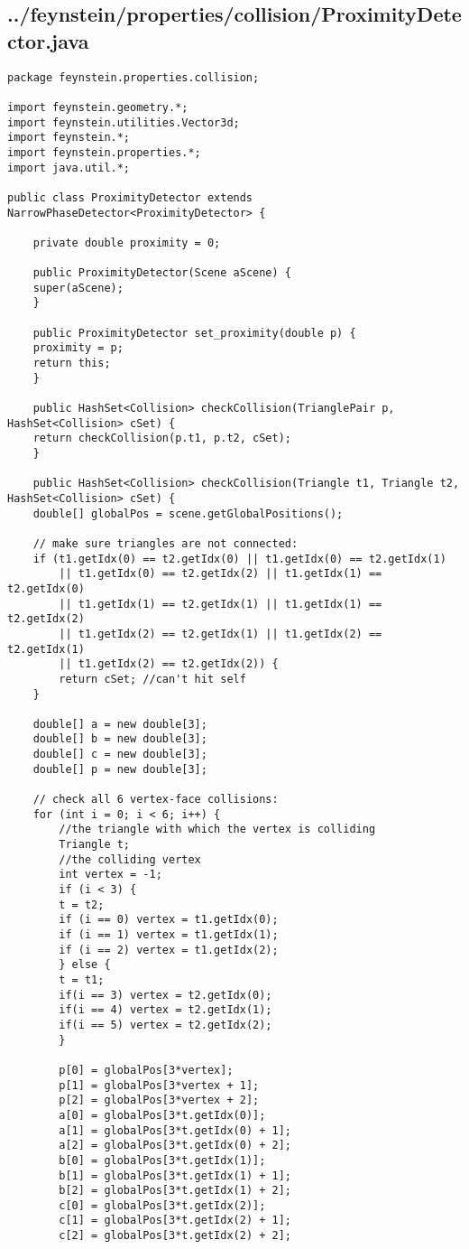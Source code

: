 \subsection*{../feynstein/properties/collision/ProximityDetector.java}
\begin{lstlisting}
package feynstein.properties.collision;

import feynstein.geometry.*;
import feynstein.utilities.Vector3d;
import feynstein.*;
import feynstein.properties.*;
import java.util.*;

public class ProximityDetector extends NarrowPhaseDetector<ProximityDetector> {

    private double proximity = 0;   

    public ProximityDetector(Scene aScene) {
	super(aScene);
    }

    public ProximityDetector set_proximity(double p) {
	proximity = p;
	return this;
    }
    
    public HashSet<Collision> checkCollision(TrianglePair p, HashSet<Collision> cSet) {
	return checkCollision(p.t1, p.t2, cSet);
    }

    public HashSet<Collision> checkCollision(Triangle t1, Triangle t2, HashSet<Collision> cSet) {
	double[] globalPos = scene.getGlobalPositions();

	// make sure triangles are not connected:
	if (t1.getIdx(0) == t2.getIdx(0) || t1.getIdx(0) == t2.getIdx(1) 
	    || t1.getIdx(0) == t2.getIdx(2) || t1.getIdx(1) == t2.getIdx(0) 
	    || t1.getIdx(1) == t2.getIdx(1) || t1.getIdx(1) == t2.getIdx(2) 
	    || t1.getIdx(2) == t2.getIdx(1) || t1.getIdx(2) == t2.getIdx(1) 
	    || t1.getIdx(2) == t2.getIdx(2)) {
	    return cSet; //can't hit self
	}
	
	double[] a = new double[3];
	double[] b = new double[3];
	double[] c = new double[3];
	double[] p = new double[3];

	// check all 6 vertex-face collisions:
	for (int i = 0; i < 6; i++) {
	    //the triangle with which the vertex is colliding
	    Triangle t;
	    //the colliding vertex
	    int vertex = -1;
	    if (i < 3) {
		t = t2;
		if (i == 0) vertex = t1.getIdx(0);
		if (i == 1) vertex = t1.getIdx(1);
		if (i == 2) vertex = t1.getIdx(2);
	    } else {
		t = t1;
		if(i == 3) vertex = t2.getIdx(0);
		if(i == 4) vertex = t2.getIdx(1);
		if(i == 5) vertex = t2.getIdx(2);
	    }

	    p[0] = globalPos[3*vertex];
	    p[1] = globalPos[3*vertex + 1];
	    p[2] = globalPos[3*vertex + 2];
	    a[0] = globalPos[3*t.getIdx(0)];	
	    a[1] = globalPos[3*t.getIdx(0) + 1];
	    a[2] = globalPos[3*t.getIdx(0) + 2];
	    b[0] = globalPos[3*t.getIdx(1)];
	    b[1] = globalPos[3*t.getIdx(1) + 1];
	    b[2] = globalPos[3*t.getIdx(1) + 2];
	    c[0] = globalPos[3*t.getIdx(2)];
	    c[1] = globalPos[3*t.getIdx(2) + 1];
	    c[2] = globalPos[3*t.getIdx(2) + 2];


\end{lstlisting}
